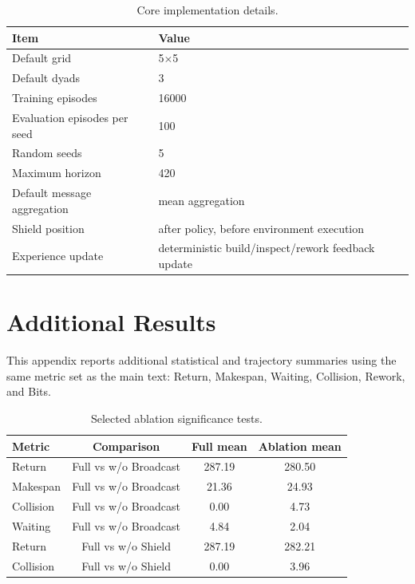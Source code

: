 \documentclass[fleqn,10pt]{wlpeerj}
\begin{document}
\begin{table}[htbp]
\centering
\caption{Core implementation details.}
\label{tab:hyperparams}
\begin{tabular}{ll}
\toprule
Item & Value \\
\midrule
Default grid & 5$\times$5 \\
Default dyads & 3 \\
Training episodes & 16000 \\
Evaluation episodes per seed & 100 \\
Random seeds & 5 \\
Maximum horizon & 420 \\
Default message aggregation & mean aggregation \\
Shield position & after policy, before environment execution \\
Experience update & deterministic build/inspect/rework feedback update \\
\bottomrule
\end{tabular}
\end{table}

\section{Additional Results}
\label{app:additional_results}

This appendix reports additional statistical and trajectory summaries using the same metric set as the main text: Return, Makespan, Waiting, Collision, Rework, and Bits.

\begin{table}[htbp]
\centering
\caption{Selected ablation significance tests.}
\label{tab:ablation_sig}
\begin{tabular}{lccc}
\toprule
Metric & Comparison & Full mean & Ablation mean \\
\midrule
Return & Full vs w/o Broadcast & 287.19 & 280.50 \\
Makespan & Full vs w/o Broadcast & 21.36 & 24.93 \\
Collision & Full vs w/o Broadcast & 0.00 & 4.73 \\
Waiting & Full vs w/o Broadcast & 4.84 & 2.04 \\
Return & Full vs w/o Shield & 287.19 & 282.21 \\
Collision & Full vs w/o Shield & 0.00 & 3.96 \\
\bottomrule
\end{tabular}
\end{table}
\end{document}
